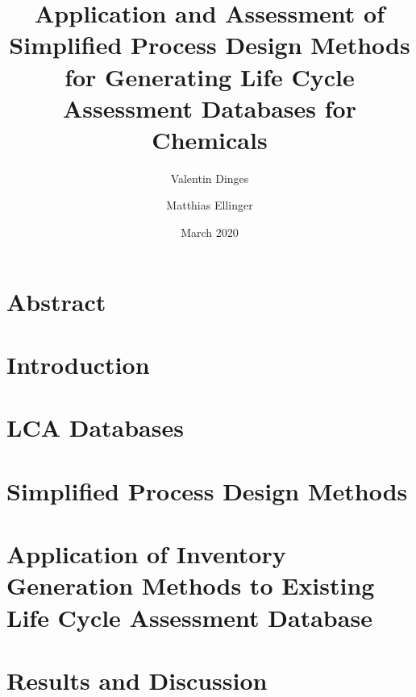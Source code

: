 
%
 

\title{Application and Assessment of Simplified Process Design Methods for Generating Life Cycle Assessment Databases for Chemicals}
\author{Valentin Dinges \and Matthias Ellinger}
\date{March 2020}


\setlength{\parindent}{0pt}
\setlength{\parskip}{1.5ex plus0.5ex minus0.5ex}

\maketitle


\tableofcontents

\chapter*{Abstract}


\chapter{Introduction}


\chapter{\acl{LCA} Databases}


\chapter{Simplified Process Design Methods}


\chapter{Application of Inventory Generation Methods to Existing Life Cycle Assessment Database}


\chapter{Results and Discussion}


